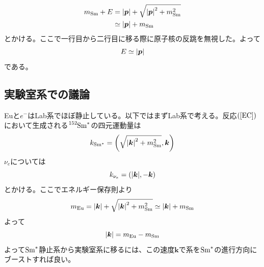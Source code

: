 \documentclass[dvipdfmx]{jreport}
\begin{document}
\begin{equation}
  \begin{split}
    m_{\mathrm{Sm}} + E &= \abs{\boldsymbol{p}} + \sqrt{{\abs{\boldsymbol{p}}}^{2} + m^{2}_{\mathrm{Sm}}}\\
    &\simeq \abs{\boldsymbol{p}} + m_{\mathrm{Sm}}
  \end{split}
\end{equation}
とかける。ここで一行目から二行目に移る際に原子核の反跳を無視した。よって
\begin{equation}
  E \simeq \abs{\boldsymbol{p}}
\end{equation}
である。

\subsection{実験室系での議論}
Euと$e^{-}$はLab系でほぼ静止している。以下ではまずLab系で考える。反応$\qty(\ref{EC})$において生成される$\ce{^{152}Sm^{*}}$の四元運動量は
\begin{equation}
  k_{\mathrm{Sm^{*}}} = \qty(\sqrt{{\abs{\boldsymbol{k}}}^{2} + m^{2}_{\mathrm{Sm}}},\boldsymbol{k}) \\  
\end{equation}
$\nu_{e}$については
\begin{equation}
  k_{\nu_{e}} = \qty(\abs{\boldsymbol{k}},-\boldsymbol{k})
\end{equation}
とかける。ここでエネルギー保存則より
\begin{equation}
  m_{\mathrm{Eu}} = \abs{\boldsymbol{k}} + \sqrt{{\abs{\boldsymbol{k}}}^{2} + m^{2}_{\mathrm{Sm}}} \simeq \abs{\boldsymbol{k}} + m_{\mathrm{Sm}}
\end{equation}
よって
\begin{equation}
  \abs{\boldsymbol{k}} = m_{\mathrm{Eu}} - m_{\mathrm{Sm}}
\end{equation}
よって$\ce{Sm^{*}}$静止系から実験室系に移るには、この速度$\boldsymbol{k}$で系を$\ce{Sm^{*}}$の進行方向にブーストすれば良い。
\end{document}
